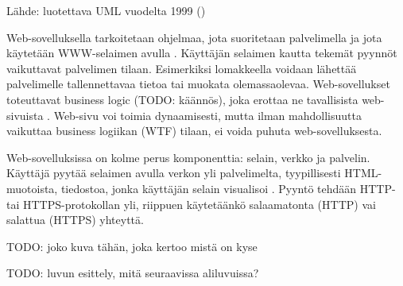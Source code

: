 Lähde: luotettava UML vuodelta 1999 (\cite{uml})

Web-sovelluksella tarkoitetaan ohjelmaa, jota suoritetaan palvelimella ja jota käytetään WWW-selaimen avulla \cite{uml}. Käyttäjän selaimen kautta tekemät pyynnöt vaikuttavat palvelimen tilaan. Esimerkiksi lomakkeella voidaan lähettää palvelimelle tallennettavaa tietoa tai muokata olemassaolevaa. Web-sovellukset toteuttavat business logic (TODO: käännös), joka erottaa ne tavallisista web-sivuista \cite{uml}. Web-sivu voi toimia dynaamisesti, mutta ilman mahdollisuutta vaikuttaa business logiikan (WTF) tilaan, ei voida puhuta web-sovelluksesta.

Web-sovelluksissa on kolme perus komponenttia: selain, verkko ja palvelin. Käyttäjä pyytää selaimen avulla verkon yli palvelimelta, tyypillisesti HTML-muotoista, tiedostoa, jonka käyttäjän selain visualisoi \cite{uml}. Pyyntö tehdään HTTP- tai HTTPS-protokollan yli, riippuen käytetäänkö salaamatonta (HTTP) vai salattua (HTTPS) yhteyttä.

TODO: joko kuva tähän, joka kertoo mistä on kyse

TODO: luvun esittely, mitä seuraavissa aliluvuissa?